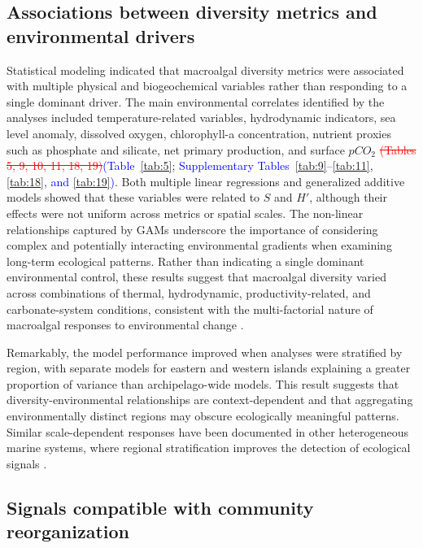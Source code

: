 \documentclass[a4paper,fleqn]{cas-sc}
\DeclareRobustCommand{\deleted}[1]{\textcolor{red}{\sout{#1}}}
\DeclareRobustCommand{\added}[1]{\textcolor{blue}{#1}}
\begin{document}
\subsection{Associations between diversity metrics and environmental drivers}

Statistical modeling indicated that macroalgal diversity metrics were associated with multiple physical and biogeochemical variables rather than responding to a single dominant driver. The main environmental correlates identified by the analyses included temperature-related variables, hydrodynamic indicators, sea level anomaly, dissolved oxygen, chlorophyll-a concentration, nutrient proxies such as phosphate and silicate, net primary production, and surface $pCO_{2}$ \deleted{(Tables 5, 9, 10, 11, 18, 19)}\added{(Table~\ref{tab:5}; Supplementary Tables~\ref{tab:9}--\ref{tab:11}, \ref{tab:18}, and \ref{tab:19})}. Both multiple linear regressions and generalized additive models showed that these variables were related to $S$ and $H'$, although their effects were not uniform across metrics or spatial scales. The non-linear relationships captured by GAMs underscore the importance of considering complex and potentially interacting environmental gradients when examining long-term ecological patterns. Rather than indicating a single dominant environmental control, these results suggest that macroalgal diversity varied across combinations of thermal, hydrodynamic, productivity-related, and carbonate-system conditions, consistent with the multi-factorial nature of macroalgal responses to environmental change \citep{RILOV2020105045, JI202191, Noissetteetal2022}.

Remarkably, the model performance improved when analyses were stratified by region, with separate models for eastern and western islands explaining a greater proportion of variance than archipelago-wide models. This result suggests that diversity-environmental relationships are context-dependent and that aggregating environmentally distinct regions may obscure ecologically meaningful patterns. Similar scale-dependent responses have been documented in other heterogeneous marine systems, where regional stratification improves the detection of ecological signals \citep{Drexle2013, Caselle2020}.

\subsection{Signals compatible with community reorganization}
\end{document}
